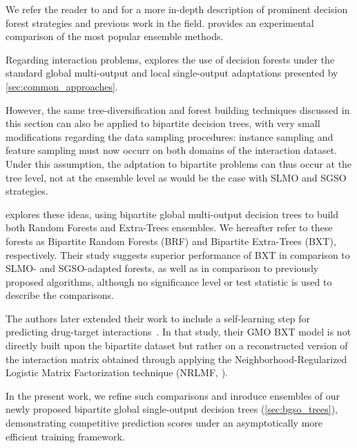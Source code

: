 We refer the reader to \citet{sagi2018ensemble} and \citet{fawagreh2014random} for a more in-depth description of prominent decision forest strategies and previous work in the field. \citet{amasyali2011comparison} provides an experimental comparison of the most popular ensemble methods.  %

Regarding interaction problems, \citet{schrynemackers2015classifying} explores the use of decision forests under the standard global multi-output and local single-output adaptations presented by \autoref{sec:common_approaches}.

However, the same tree-diversification and forest building techniques discussed in this section can also be applied to bipartite decision trees, with very small modifications regarding the data sampling procedures: instance sampling and feature sampling must now occurr on both domains of the interaction dataset. Under this assumption, the adptation to bipartite problems can thus occur at the tree level, not at the ensemble level as would be the case with SLMO and SGSO strategies.

\cite{pliakos2019network} explores these ideas, using bipartite global multi-output decision trees to build both Random Forests and Extra-Trees ensembles. We hereafter refer to these forests as Bipartite Random Forests (BRF) and Bipartite Extra-Trees (BXT), respectively. Their study suggests superior performance of BXT in comparison to SLMO- and SGSO-adapted forests, as well as in comparison to previously proposed algorithms, although no significance level or test statistic is used to describe the comparisons.

The authors later extended their work to include a self-learning step for predicting drug-target interactions~\cite{pliakos2020drugtarget}. In that study, their GMO BXT model is not directly built upon the bipartite dataset but rather on a reconstructed version of the interaction matrix obtained through applying the Neighborhood-Regularized Logistic Matrix Factorization technique (NRLMF, \citet{liu2016neighborhood}).

In the present work, we refine such comparisons and inroduce ensembles of our newly proposed bipartite global single-output decision trees (\autoref{sec:bgso_trees}), demonstrating competitive prediction scores under an asymptotically more efficient training framework.



